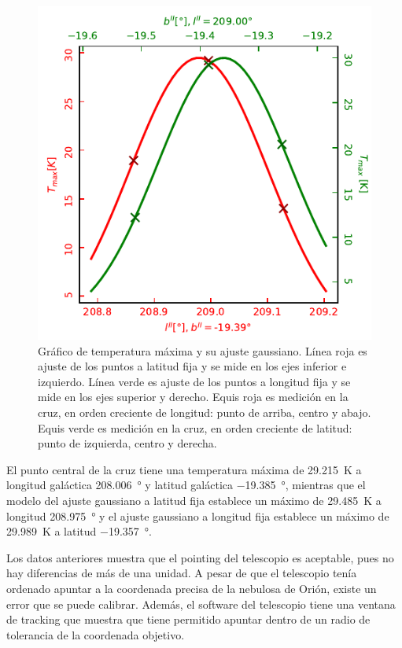 \begin{figure}[htbp]
	\centering
	\includegraphics{tmax.pdf}
	\caption{Gráfico de temperatura máxima y su ajuste gaussiano. Línea roja es ajuste de los puntos a latitud fija y se mide en los ejes inferior e izquierdo. Línea verde es ajuste de los puntos a longitud fija y se mide en los ejes superior y derecho. Equis roja es medición en la cruz, en orden creciente de longitud: punto de arriba, centro y abajo. Equis verde es medición en la cruz, en orden creciente de latitud: punto de izquierda, centro y derecha.}
	\label{fig:tmax}
\end{figure}

El punto central de la cruz tiene una temperatura máxima de \SI{29.215}{\kelvin} a longitud galáctica \SI{208.006}{\degree} y latitud galáctica \SI{-19.385}{\degree}, mientras que el modelo del ajuste gaussiano a latitud fija establece un máximo de \SI{29.485}{\kelvin} a longitud \SI{208.975}{\degree} y el ajuste gaussiano a longitud fija establece un máximo de \SI{29.989}{\kelvin} a latitud \SI{-19.357}{\degree}.

Los datos anteriores muestra que el pointing del telescopio es aceptable, pues no hay diferencias de más de una unidad. A pesar de que el telescopio tenía ordenado apuntar a la coordenada precisa de la nebulosa de Orión, existe un error que se puede calibrar. Además, el software del telescopio tiene una ventana de tracking que muestra que tiene permitido apuntar dentro de un radio de tolerancia de la coordenada objetivo.

